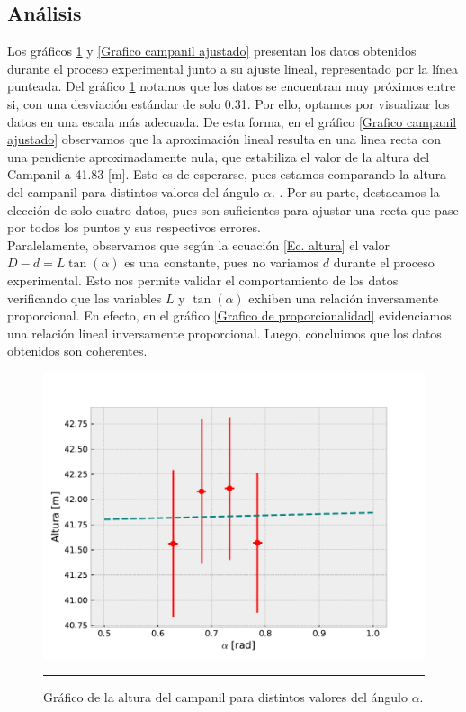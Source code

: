 \documentclass[10pt,a4paper]{article}
\begin{document}
\begin{multicols}{2}
	\section{Análisis}
Los gráficos \ref{Grafico campanil} y \ref{Grafico campanil ajustado}  presentan los datos obtenidos durante el proceso experimental junto a su ajuste lineal, 		representado por la línea punteada. Del gráfico \ref{Grafico campanil} notamos que los datos se encuentran muy próximos entre si, 	con una desviación estándar de solo 0.31. Por ello, optamos por visualizar los datos en una escala más adecuada.  De esta forma, en el gráfico \ref{Grafico campanil ajustado} observamos que la aproximación lineal resulta en una linea recta con una pendiente aproximadamente nula, que estabiliza el valor de la altura del Campanil a 41.83 [m]. Esto es de esperarse, pues estamos comparando la altura del campanil para distintos valores del ángulo $\alpha$. . Por su parte, destacamos la elección de solo cuatro datos, pues son suficientes para ajustar una recta que pase por todos los puntos y sus respectivos errores.\\

Paralelamente, observamos que según la ecuación \ref{Ec. altura} el valor $D - d = L \tan(\alpha)$ es una constante, pues no variamos  $d$ durante el proceso experimental. Esto nos permite validar el comportamiento de los datos verificando que las variables $L$ y $\tan(\alpha)$ exhiben una relación inversamente proporcional. En efecto, en el gráfico \ref{Grafico de proporcionalidad} evidenciamos una relación lineal inversamente proporcional. Luego, concluimos que los datos obtenidos son coherentes.
	
	\begin{figure}[H]
		\centering
		\includegraphics[scale=0.5]{IMG/altura_1.pdf} 
		\caption{Gráfico de la altura del campanil para distintos valores del ángulo $\alpha$.}
		\label{Grafico campanil}
		\rule{80mm}{0.1mm}
	\end{figure}


\end{multicols}
\end{document}
